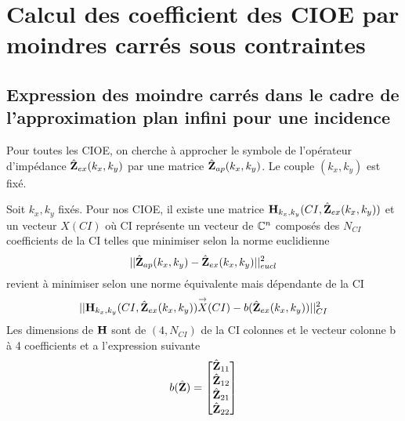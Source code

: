 \section{Calcul des coefficient des CIOE par moindres carrés sous contraintes}


\subsection{Expression des moindre carrés dans le cadre de l'approximation plan infini pour une incidence}
  Pour toutes les CIOE, on cherche à approcher le symbole de l'opérateur d'impédance \(\hat{\mathbf{Z}}_{ex}(k_x,k_y)\) par une matrice \(\hat{\mathbf{Z}}_{ap}(k_x,k_y)\). Le couple \((k_x,k_y)\) est fixé.

  \begin{prop}
    Soit \(k_x,k_y\) fixés.
    Pour nos CIOE, il existe une matrice \(\mathbf{H}_{k_x,k_y}(CI,\hat{\mathbf{Z}}_{ex}(k_x,k_y))\) et un vecteur \(X(CI)\) où CI représente un vecteur de \(\mathbb C^n\) composés des \(N_{CI}\) coefficients de la CI telles que minimiser selon la norme euclidienne
    \[
      ||\hat{\mathbf{Z}}_{ap}(k_x,k_y)-\hat{\mathbf{Z}}_{ex}(k_x,k_y)||^2_{eucl}
    \] 
    revient à minimiser selon une norme équivalente mais dépendante de la CI
    \[ 
      || \mathbf{H}_{k_x,k_y}(CI,\hat{\mathbf{Z}}_{ex}(k_x,k_y)) {\overset{\rightarrow}{X}}(CI) - b(\hat{\mathbf{Z}}_{ex}(k_x,k_y)) ||^2_{CI}
    \]
    Les dimensions de \(\mathbf{H}\) sont de \( (4,N_{CI}) \) de la CI colonnes et le vecteur colonne b à 4 coefficients et a l'expression suivante
    \begin{align}
      b(\hat{\mathbf{Z}}) = \begin{bmatrix} \hat{\mathbf{Z}}_{11} \\ \hat{\mathbf{Z}}_{12}\\ \hat{\mathbf{Z}}_{21} \\ \hat{\mathbf{Z}}_{22} \end{bmatrix}
    \end{align}
  \end{prop}

